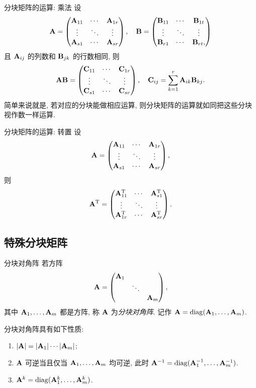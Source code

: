 \begin{frame}{分块矩阵的运算: 乘法}
	\onslide<+->
	设
	\[{\mathbf{A}}=\begin{pmatrix}
		{\mathbf{A}}_{11}&\cdots&{\mathbf{A}}_{1r}\\
		\vdots&\ddots&\vdots\\
		{\mathbf{A}}_{s1}&\cdots&{\mathbf{A}}_{sr}
	\end{pmatrix},\quad
	{\mathbf{B}}=\begin{pmatrix}
		{\mathbf{B}}_{11}&\cdots&{\mathbf{B}}_{1t}\\
		\vdots&\ddots&\vdots\\
		{\mathbf{B}}_{r1}&\cdots&{\mathbf{B}}_{rt},
	\end{pmatrix}\]
	且 ${\mathbf{A}}_{ij}$ 的列数和 ${\mathbf{B}}_{jk}$ 的行数相同, 则
	\[{\mathbf{A}}{\mathbf{B}}=\begin{pmatrix}
		{\mathbf{C}}_{11}&\cdots&{\mathbf{C}}_{1r}\\
		\vdots&\ddots&\vdots\\
		{\mathbf{C}}_{s1}&\cdots&{\mathbf{C}}_{sr}
	\end{pmatrix},\quad{\mathbf{C}}_{ij}=\sum_{k=1}^r {\mathbf{A}}_{ik}{\mathbf{B}}_{kj}.\]
	\onslide<+->
	简单来说就是, 若对应的分块能做相应运算, 则分块矩阵的运算就如同把这些分块视作数一样运算.
\end{frame}


\begin{frame}{分块矩阵的运算: 转置}
	\onslide<+->
	设
	\[{\mathbf{A}}=\begin{pmatrix}
		{\mathbf{A}}_{11}&\cdots&{\mathbf{A}}_{1r}\\
		\vdots&\ddots&\vdots\\
		{\mathbf{A}}_{s1}&\cdots&{\mathbf{A}}_{sr}
	\end{pmatrix},\]
	则
	\[{\mathbf{A}}^{\mathrm{T}}=\begin{pmatrix}
		{\mathbf{A}}_{11}^{\mathrm{T}}&\cdots&{\mathbf{A}}_{s1}^{\mathrm{T}}\\
		\vdots&\ddots&\vdots\\
		{\mathbf{A}}_{1r}^{\mathrm{T}}&\cdots&{\mathbf{A}}_{sr}^{\mathrm{T}}
	\end{pmatrix}.\]
\end{frame}


\subsection{特殊分块矩阵}
\begin{frame}{分块对角阵}
	\onslide<+->
	若方阵
	\[{\mathbf{A}}=\begin{pmatrix}
		{\mathbf{A}}_1&&\\
		&\ddots&\\
		&&{\mathbf{A}}_m
	\end{pmatrix},\]
	其中 ${\mathbf{A}}_1,\dots,{\mathbf{A}}_m$ 都是方阵,
	\onslide<+->
	称 ${\mathbf{A}}$ 为\emph{分块对角阵}.
	\onslide<+->
	记作 ${\mathbf{A}}={\mathrm{diag}}({\mathbf{A}}_1,\dots,{\mathbf{A}}_m)$.

	\onslide<+->
	分块对角阵具有如下性质:
	\begin{enumerate}
		\item $|{\mathbf{A}}|=|{\mathbf{A}}_1|\cdots|{\mathbf{A}}_m|$;
		\item ${\mathbf{A}}$ 可逆当且仅当 ${\mathbf{A}}_1,\dots,{\mathbf{A}}_m$ 均可逆, 此时
		${\mathbf{A}}^{-1}={\mathrm{diag}}({\mathbf{A}}_1^{-1},\dots,{\mathbf{A}}_m^{-1})$.
		\item ${\mathbf{A}}^k={\mathrm{diag}}({\mathbf{A}}_1^k,\dots,{\mathbf{A}}_m^k)$.
	\end{enumerate}
\end{frame}


